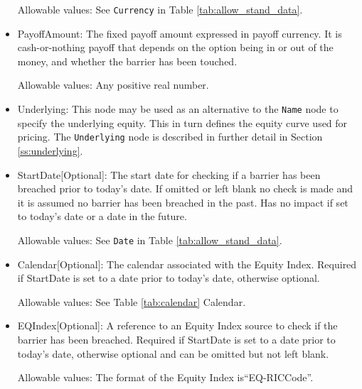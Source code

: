 \begin{itemize}
Allowable values:  See \lstinline!Currency!  in Table \ref{tab:allow_stand_data}.

\item PayoffAmount: The fixed payoff amount expressed in payoff currency. It is cash-or-nothing payoff that depends on the option being in or out of the money, and whether the barrier has been touched.

Allowable values:  Any positive real number.

\item Underlying:  This node may be used as an alternative to the \lstinline!Name! node to specify the underlying equity. This in turn defines the equity curve used for pricing. The \lstinline!Underlying! node is described in further detail in Section \ref{ss:underlying}.

\item StartDate[Optional]: The start date for checking if a barrier has been breached prior to today's date. If omitted or left blank no check is made and it is assumed no barrier has been breached in the past. Has no impact if set to today's date or a date in the future.

Allowable values:  See \lstinline!Date! in Table \ref{tab:allow_stand_data}.

\item Calendar[Optional]: The calendar associated with the Equity Index. Required if StartDate is set to a date prior to today's date, otherwise optional.

Allowable values: See Table \ref{tab:calendar} Calendar.

\item EQIndex[Optional]: A reference to an Equity Index source to check if the barrier has been breached. Required if StartDate is set to a date prior to today's date, otherwise optional and can be omitted but not left blank.

Allowable values:  The format of the Equity Index is``EQ-RICCode''. 

\end{itemize}
